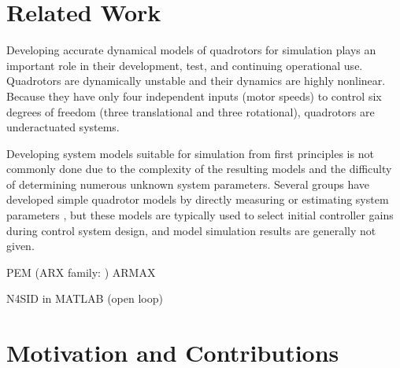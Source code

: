 \section{Related Work}
Developing accurate dynamical models of quadrotors for simulation plays an important role in their development, test, and continuing operational use. Quadrotors are dynamically unstable and their dynamics are highly nonlinear. Because they have only four independent inputs (motor speeds) to control six degrees of freedom (three translational and three rotational), quadrotors are underactuated systems. 

Developing system models suitable for simulation from first principles is not commonly done due to the complexity of the resulting models and the difficulty of determining numerous unknown system parameters. Several groups have developed simple quadrotor models by directly measuring or estimating system parameters \cite{bresciani2008modelling, domingues2009quadrotor, kivrak2006design, pounds2006modelling, schreier2012modeling}, but these models are typically used to select initial controller gains during control system design, and model simulation results are generally not given. 



PEM (ARX family: \cite{chamberlain2011system})
ARMAX \cite{schreurs2013open}
\cite{miller2011open}
\cite{lee2011attitude}

N4SID in MATLAB (open loop) \cite{batmazdesign}





\section{Motivation and Contributions}




